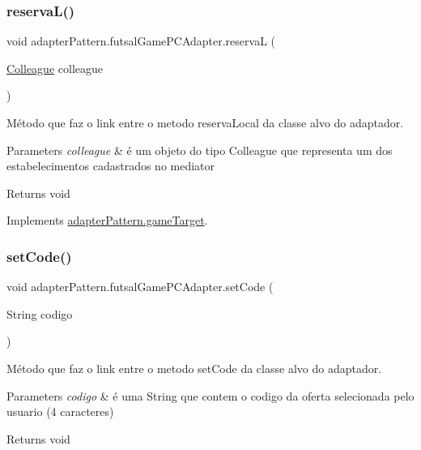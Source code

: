 \subsubsection{\texorpdfstring{reservaL()}{reservaL()}}
{\footnotesize\ttfamily void adapter\+Pattern.\+futsal\+Game\+P\+C\+Adapter.\+reservaL (\begin{DoxyParamCaption}\item[{\mbox{\hyperlink{classmediator_pattern_1_1_colleague}{Colleague}}}]{colleague }\end{DoxyParamCaption})}



Método que faz o link entre o metodo reserva\+Local da classe alvo do adaptador. 


\begin{DoxyParams}{Parameters}
{\em colleague} & é um objeto do tipo Colleague que representa um dos estabelecimentos cadastrados no mediator \\
\hline
\end{DoxyParams}
\begin{DoxyReturn}{Returns}
void 
\end{DoxyReturn}


Implements \mbox{\hyperlink{interfaceadapter_pattern_1_1game_target_a663405a3d10988de25c6ea3ef63c68eb}{adapter\+Pattern.\+game\+Target}}.

\mbox{\label{classadapter_pattern_1_1futsal_game_p_c_adapter_ac423dff95c8ec06729608750d9a01021}} 
\subsubsection{\texorpdfstring{setCode()}{setCode()}}
{\footnotesize\ttfamily void adapter\+Pattern.\+futsal\+Game\+P\+C\+Adapter.\+set\+Code (\begin{DoxyParamCaption}\item[{String}]{codigo }\end{DoxyParamCaption})}



Método que faz o link entre o metodo set\+Code da classe alvo do adaptador. 


\begin{DoxyParams}{Parameters}
{\em codigo} & é uma String que contem o codigo da oferta selecionada pelo usuario (4 caracteres) \\
\hline
\end{DoxyParams}
\begin{DoxyReturn}{Returns}
void 
\end{DoxyReturn}


